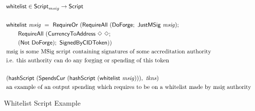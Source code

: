 \begin{figure*}[htb]
  \begin{align*}
    & \mathsf{whitelist} \in\mathsf{Script}_{msig}\to\mathsf{Script}  \\~\\
    & \mathsf{whitelist}  ~\mathit{msig}~ =~ \mathsf{RequireOr}~
      (\mathsf{RequireAll}~(\mathsf{DoForge};~\mathsf{JustMSig}~\mathit{msig});~\\
    &~~~~~~ \mathsf{RequireAll}~(\mathsf{CurrencyToAddress}~\Diamond~\Diamond ;\\
    &~~~~~~ (\mathsf{Not}~\mathsf{DoForge});~\mathsf{SignedByCIDToken})) \\
    & \text{msig is some MSig script containing signatures of some accreditation authority} \\
    & \text{i.e. this authority can do any forging or spending of this token} \\~\\
    & (\mathsf{hashScript}~(\mathsf{SpendsCur}~(\mathsf{hashScript}~(\mathsf{whitelist}~\mathit{msig}))),~ \mathit{tkns}) \\
    & \text{an example of an output spending which requires to be on a whitelist made by msig authority}
  \end{align*}
  \caption{Whitelist Script Example}
  \label{fig:whitelist-example}
\end{figure*}
